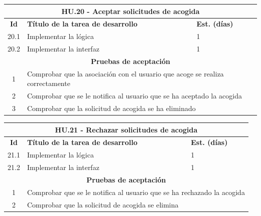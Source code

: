 \begin{table}[H]
	\centering
\begin{tabular}{|c|p{9.5cm}|p{1cm}|}
	\hline
	\multicolumn{3}{|c|}{\textbf{HU.20 - Aceptar solicitudes de acogida}} \\
	\hline
	\textbf{Id} & \textbf{Título de la tarea de desarrollo} & \textbf{Est. (días)} \\
	\hline
	20.1 &  Implementar la lógica & 1 \\ \hline
	20.2 &  Implementar la interfaz & 1 \\ \hline
	\multicolumn{3}{|c|}{\textbf{Pruebas de aceptación}} \\ \hline
	1 & \multicolumn{2}{|p{12cm}|}{Comprobar que la asociación con el usuario que acoge se realiza correctamente} \\ \hline
	2 & \multicolumn{2}{|p{12cm}|}{Comprobar que se le notifica al usuario que se ha aceptado la acogida} \\ \hline
	3 & \multicolumn{2}{|p{12cm}|}{Comprobar que la solicitud de acogida se ha eliminado} \\ \hline
	
	
\end{tabular} 
\end{table}

\begin{table}[H]
	\centering
\begin{tabular}{|c|p{9.5cm}|p{1cm}|}
	\hline
	\multicolumn{3}{|c|}{\textbf{HU.21 - Rechazar solicitudes de acogida}} \\
	\hline
	\textbf{Id} & \textbf{Título de la tarea de desarrollo} & \textbf{Est. (días)} \\
	\hline
	21.1 &  Implementar la lógica & 1 \\ \hline
	21.2 &  Implementar la interfaz & 1 \\ \hline
	\multicolumn{3}{|c|}{\textbf{Pruebas de aceptación}} \\ \hline
	1 & \multicolumn{2}{|p{12cm}|}{Comprobar que se le notifica al usuario que se ha rechazado la acogida} \\ \hline
	2 & \multicolumn{2}{|p{12cm}|}{Comprobar que la solicitud de acogida se elimina} \\ \hline
	
\end{tabular} 
\end{table}

